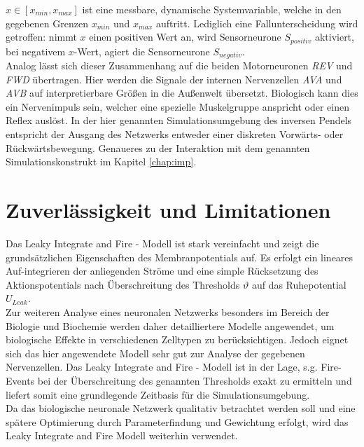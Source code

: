 	$x\in[x_{min}, x_{max}]$ ist eine messbare, dynamische Systemvariable, welche in den gegebenen Grenzen $x_{min} $ und $x_{max}$ auftritt. Lediglich eine Fallunterscheidung wird getroffen: nimmt $x$ einen positiven Wert an, wird Sensorneurone $S_{positiv}$ aktiviert, bei negativem $x$-Wert, agiert die Sensorneurone $S_{negativ}$.\\
	Analog lässt sich dieser Zusammenhang auf die beiden Motorneuronen \textit{REV} und \textit{FWD} übertragen. Hier werden die Signale der internen Nervenzellen \textit{AVA} und \textit{AVB} auf interpretierbare Größen in die Außenwelt übersetzt. Biologisch kann dies ein Nervenimpuls sein, welcher eine spezielle Muskelgruppe anspricht oder einen Reflex auslöst. In der hier genannten Simulationsumgebung des inversen Pendels entspricht der Ausgang des Netzwerks entweder einer diskreten Vorwärts- oder Rückwärtsbewegung. Genaueres zu der Interaktion mit dem genannten Simulationskonstrukt im Kapitel \ref{chap:imp}.

\section{Zuverlässigkeit und Limitationen}
\label{sec:lif_lim}
	Das Leaky Integrate and Fire - Modell ist stark vereinfacht und zeigt die grundsätzlichen Eigenschaften des Membranpotentials auf. Es erfolgt ein lineares Auf-integrieren der anliegenden Ströme und eine simple Rücksetzung des Aktionspotentials nach Überschreitung des Thresholds $\vartheta$ auf das Ruhepotential $U_{Leak}$.\\
	Zur weiteren Analyse eines neuronalen Netzwerks besonders im Bereich der Biologie und Biochemie werden daher detailliertere Modelle angewendet, um biologische Effekte in verschiedenen Zelltypen zu berücksichtigen. Jedoch eignet sich das hier angewendete Modell sehr gut zur Analyse der gegebenen Nervenzellen. Das Leaky Integrate and Fire - Modell ist in der Lage, s.g. Fire-Events bei der Überschreitung des genannten Thresholds exakt zu ermitteln und liefert somit eine grundlegende Zeitbasis für die Simulationsumgebung.\\
	Da das biologische neuronale Netzwerk qualitativ betrachtet werden soll und eine spätere Optimierung durch Parameterfindung und Gewichtung erfolgt, wird das Leaky Integrate and Fire Modell weiterhin verwendet.

